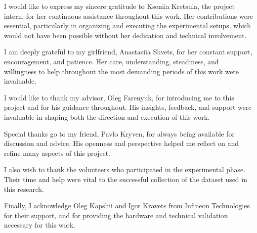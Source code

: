 \begin{acknowledgements}
\addchaptertocentry{\acknowledgementname}

\setlength{\parskip}{\baselineskip}

I would like to express my sincere gratitude to Kseniia Kretsula, the project intern, for her continuous assistance throughout this work. Her contributions were essential, particularly in organizing and executing the experimental setups, which would not have been possible without her dedication and technical involvement.

I am deeply grateful to my girlfriend, Anastasiia Shvets, for her constant support, encouragement, and patience. Her care, understanding, steadiness, and willingness to help throughout the most demanding periods of this work were invaluable.

I would like to thank my advisor, Oleg Farenyuk, for introducing me to this project and for his guidance throughout. His insights, feedback, and support were invaluable in shaping both the direction and execution of this work.

Special thanks go to my friend, Pavlo Kryven, for always being available for discussion and advice. His openness and perspective helped me reflect on and refine many aspects of this project.

I also wish to thank the volunteers who participated in the experimental phase. Their time and help were vital to the successful collection of the dataset used in this research.

Finally, I acknowledge Oleg Kapshii and Igor Kravets from Infineon Technologies for their support, and for providing the hardware and technical validation necessary for this work.

\end{acknowledgements}
